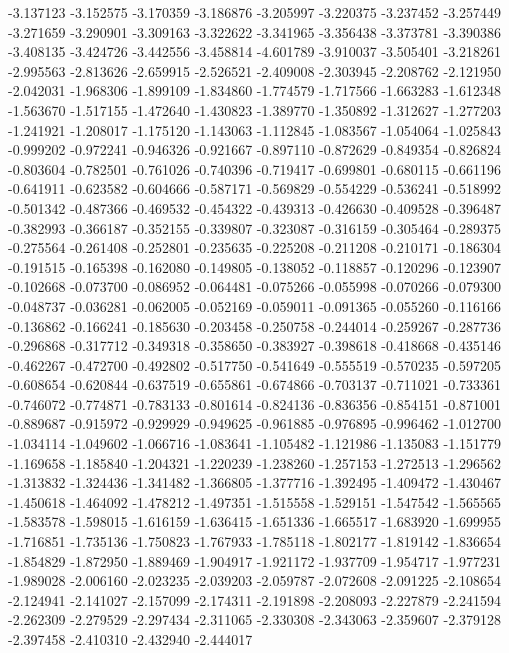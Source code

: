 -3.137123
-3.152575
-3.170359
-3.186876
-3.205997
-3.220375
-3.237452
-3.257449
-3.271659
-3.290901
-3.309163
-3.322622
-3.341965
-3.356438
-3.373781
-3.390386
-3.408135
-3.424726
-3.442556
-3.458814
-4.601789
-3.910037
-3.505401
-3.218261
-2.995563
-2.813626
-2.659915
-2.526521
-2.409008
-2.303945
-2.208762
-2.121950
-2.042031
-1.968306
-1.899109
-1.834860
-1.774579
-1.717566
-1.663283
-1.612348
-1.563670
-1.517155
-1.472640
-1.430823
-1.389770
-1.350892
-1.312627
-1.277203
-1.241921
-1.208017
-1.175120
-1.143063
-1.112845
-1.083567
-1.054064
-1.025843
-0.999202
-0.972241
-0.946326
-0.921667
-0.897110
-0.872629
-0.849354
-0.826824
-0.803604
-0.782501
-0.761026
-0.740396
-0.719417
-0.699801
-0.680115
-0.661196
-0.641911
-0.623582
-0.604666
-0.587171
-0.569829
-0.554229
-0.536241
-0.518992
-0.501342
-0.487366
-0.469532
-0.454322
-0.439313
-0.426630
-0.409528
-0.396487
-0.382993
-0.366187
-0.352155
-0.339807
-0.323087
-0.316159
-0.305464
-0.289375
-0.275564
-0.261408
-0.252801
-0.235635
-0.225208
-0.211208
-0.210171
-0.186304
-0.191515
-0.165398
-0.162080
-0.149805
-0.138052
-0.118857
-0.120296
-0.123907
-0.102668
-0.073700
-0.086952
-0.064481
-0.075266
-0.055998
-0.070266
-0.079300
-0.048737
-0.036281
-0.062005
-0.052169
-0.059011
-0.091365
-0.055260
-0.116166
-0.136862
-0.166241
-0.185630
-0.203458
-0.250758
-0.244014
-0.259267
-0.287736
-0.296868
-0.317712
-0.349318
-0.358650
-0.383927
-0.398618
-0.418668
-0.435146
-0.462267
-0.472700
-0.492802
-0.517750
-0.541649
-0.555519
-0.570235
-0.597205
-0.608654
-0.620844
-0.637519
-0.655861
-0.674866
-0.703137
-0.711021
-0.733361
-0.746072
-0.774871
-0.783133
-0.801614
-0.824136
-0.836356
-0.854151
-0.871001
-0.889687
-0.915972
-0.929929
-0.949625
-0.961885
-0.976895
-0.996462
-1.012700
-1.034114
-1.049602
-1.066716
-1.083641
-1.105482
-1.121986
-1.135083
-1.151779
-1.169658
-1.185840
-1.204321
-1.220239
-1.238260
-1.257153
-1.272513
-1.296562
-1.313832
-1.324436
-1.341482
-1.366805
-1.377716
-1.392495
-1.409472
-1.430467
-1.450618
-1.464092
-1.478212
-1.497351
-1.515558
-1.529151
-1.547542
-1.565565
-1.583578
-1.598015
-1.616159
-1.636415
-1.651336
-1.665517
-1.683920
-1.699955
-1.716851
-1.735136
-1.750823
-1.767933
-1.785118
-1.802177
-1.819142
-1.836654
-1.854829
-1.872950
-1.889469
-1.904917
-1.921172
-1.937709
-1.954717
-1.977231
-1.989028
-2.006160
-2.023235
-2.039203
-2.059787
-2.072608
-2.091225
-2.108654
-2.124941
-2.141027
-2.157099
-2.174311
-2.191898
-2.208093
-2.227879
-2.241594
-2.262309
-2.279529
-2.297434
-2.311065
-2.330308
-2.343063
-2.359607
-2.379128
-2.397458
-2.410310
-2.432940
-2.444017

